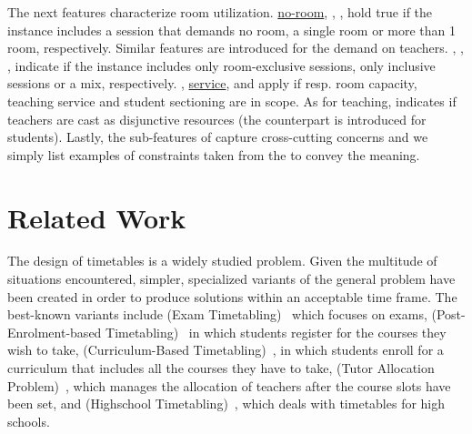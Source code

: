 \documentclass[runningheads]{llncs}
\begin{document}
The next features characterize room utilization.
\hyperref[featmodel:noroom]{no-room},
\hyperref[featmodel:singleroom]{\singleroom},
\hyperref[featmodel:multiroom]{\multiroom},
hold true if the instance includes a session that demands
no room, a single room or more than 1 room, respectively.
Similar features are introduced for the demand on teachers.
\hyperref[featmodel:allexclusive]{\allexclusive},
\hyperref[featmodel:noneexclusive]{\noneexclusive},
\hyperref[featmodel:someexclusive]{\someexclusive},
indicate if the instance includes only room-exclusive sessions, only inclusive sessions
or a mix, respectively.
\hyperref[featmodel:roomcapacity]{\roomcapacityfeat},
\hyperref[featmodel:service]{service},
and \hyperref[featmodel:sectioning]{\sectioning} apply
if resp. room capacity, teaching service and student sectioning are in scope. 
As for teaching, \hyperref[featmodel:teacheroverlap]{\teacheroverlap} indicates if teachers are cast as disjunctive resources (the counterpart is introduced for students).
Lastly, the sub-features of \hyperref[featmodel:aspects]{\aspects} capture
cross-cutting concerns and we simply list examples of constraints taken from the 
to convey the meaning.

























 \section{Related Work}
\label{sec:state-of-art}


The design of timetables is a widely studied problem. Given the multitude of situations encountered, simpler, specialized variants of the general problem have been created in order to produce solutions within an acceptable time frame.
The best-known variants include \ETT{} (Exam Timetabling)~\cite{2021_bellio_COR,2021_gorgos_SEEDA} which focuses on exams, \PETT{} (Post-Enrolment-based Timetabling)~\cite{ 2018_nagata_COR,2019_goh_JORS} in which students register for the courses they wish to take, \CBTT{} (Curriculum-Based Timetabling)~\cite{2010_hao_EJOR,2012_abdullah_IS,2016_kiefer_AOR}, in which students enroll for a curriculum that includes all the courses they have to take, \TAP{} (Tutor Allocation Problem)~\cite{2022_caselli_ESWA}, which manages the allocation of teachers after the course slots have been set, and \HTT{} (Highschool Timetabling)~\cite{2016_Kingston_AOR, 2018_stuckey_CPAIOR}, which deals with timetables for high schools.
\end{document}
